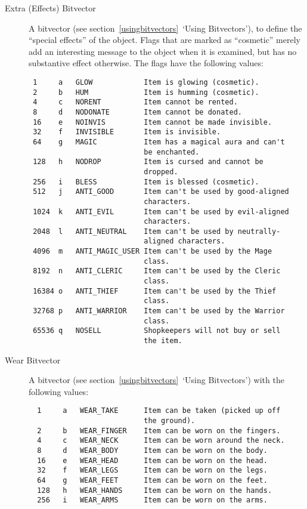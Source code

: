 \documentclass[11pt]{article}
\begin{document}
\begin{description}
\item[Extra (Effects) Bitvector] A bitvector (see section~\vref{usingbitvectors}~`Using Bitvectors'), to define the ``special effects'' of the object.  Flags that are marked as ``cosmetic'' merely add an interesting message to the object when it is examined, but has no substantive effect otherwise.  The flags have the following values:
\begin{verbatim}
 1     a   GLOW            Item is glowing (cosmetic).
 2     b   HUM             Item is humming (cosmetic).
 4     c   NORENT          Item cannot be rented.
 8     d   NODONATE        Item cannot be donated.
 16    e   NOINVIS         Item cannot be made invisible.
 32    f   INVISIBLE       Item is invisible.
 64    g   MAGIC           Item has a magical aura and can't
                           be enchanted.
 128   h   NODROP          Item is cursed and cannot be
                           dropped.
 256   i   BLESS           Item is blessed (cosmetic).
 512   j   ANTI_GOOD       Item can't be used by good-aligned
                           characters.
 1024  k   ANTI_EVIL       Item can't be used by evil-aligned
                           characters.
 2048  l   ANTI_NEUTRAL    Item can't be used by neutrally-
                           aligned characters.
 4096  m   ANTI_MAGIC_USER Item can't be used by the Mage
                           class.
 8192  n   ANTI_CLERIC     Item can't be used by the Cleric
                           class.
 16384 o   ANTI_THIEF      Item can't be used by the Thief
                           class.
 32768 p   ANTI_WARRIOR    Item can't be used by the Warrior
                           class.
 65536 q   NOSELL          Shopkeepers will not buy or sell
                           the item.
\end{verbatim}
\item[Wear Bitvector] A bitvector (see section~\vref{usingbitvectors}~`Using Bitvectors') with the following values:
\begin{verbatim}
  1     a   WEAR_TAKE      Item can be taken (picked up off
                           the ground).
  2     b   WEAR_FINGER    Item can be worn on the fingers.
  4     c   WEAR_NECK      Item can be worn around the neck.
  8     d   WEAR_BODY      Item can be worn on the body.
  16    e   WEAR_HEAD      Item can be worn on the head.
  32    f   WEAR_LEGS      Item can be worn on the legs.
  64    g   WEAR_FEET      Item can be worn on the feet.
  128   h   WEAR_HANDS     Item can be worn on the hands.
  256   i   WEAR_ARMS      Item can be worn on the arms.

\end{verbatim}
\end{description}
\end{document}
